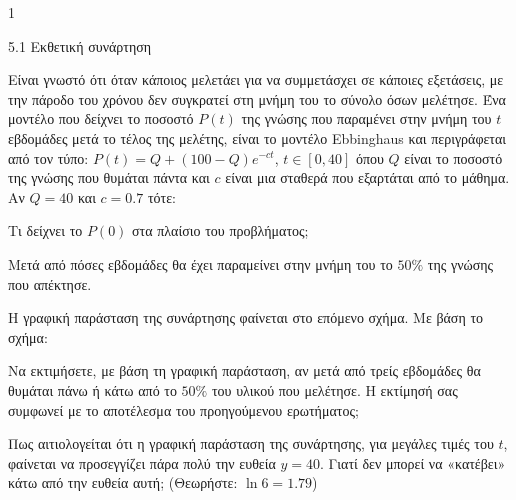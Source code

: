 \begin{ylh}{1}
\item 5.1 Εκθετική συνάρτηση
\end{ylh}
Είναι γνωστό ότι όταν κάποιος μελετάει για να συμμετάσχει σε κάποιες εξετάσεις, με την πάροδο του χρόνου δεν συγκρατεί στη μνήμη του το σύνολο όσων μελέτησε. Ένα μοντέλο που δείχνει το ποσοστό $P(t)$ της γνώσης που παραμένει στην μνήμη του $t$ εβδομάδες μετά το τέλος της μελέτης, είναι το μοντέλο Ebbinghaus και περιγράφεται από τον τύπο:
$P(t) = Q + (100 - Q)e^{-ct}$, $t \in [0, 40]$
όπου $Q$ είναι το ποσοστό της γνώσης που θυμάται πάντα και $c$ είναι μια σταθερά που εξαρτάται από το μάθημα. Αν $Q = 40$ και $c = 0.7$ τότε:
\begin{alist}
\item Τι δείχνει το $P(0)$ στα πλαίσιο του προβλήματος;
\item Μετά από πόσες εβδομάδες θα έχει παραμείνει στην μνήμη του το $50\%$ της γνώσης που απέκτησε.
\begin{center}
\end{center}
Η γραφική παράσταση της συνάρτησης φαίνεται στο επόμενο σχήμα. Με βάση το σχήμα:
\item Να εκτιμήσετε, με βάση τη γραφική παράσταση, αν μετά από τρείς εβδομάδες θα θυμάται πάνω ή κάτω από το $50\%$ του υλικού που μελέτησε. Η εκτίμησή σας συμφωνεί με το αποτέλεσμα του προηγούμενου ερωτήματος;
\item Πως αιτιολογείται ότι η γραφική παράσταση της συνάρτησης, για μεγάλες τιμές του $t$, φαίνεται να προσεγγίζει πάρα πολύ την ευθεία $y = 40$. Γιατί δεν μπορεί να «κατέβει» κάτω από την ευθεία αυτή;
(Θεωρήστε: $\ln 6 = 1.79$)
\end{alist}

